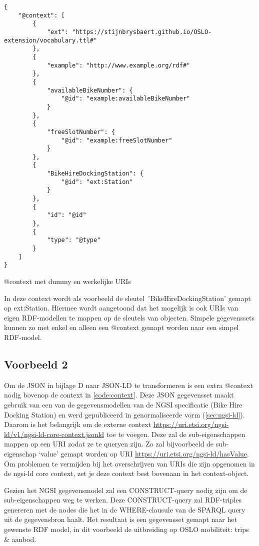 \begin{code}
\begin{verbatim}
{
    "@context": [
        {
            "ext": "https://stijnbrysbaert.github.io/OSLO-extension/vocabulary.ttl#"
        },
        {
            "example": "http://www.example.org/rdf#"
        },
        {
            "availableBikeNumber": {
                "@id": "example:availableBikeNumber"
            }
        },
        {
            "freeSlotNumber": {
                "@id": "example:freeSlotNumber"
            }
        },
        {
            "BikeHireDockingStation": {
                "@id": "ext:Station"
            }
        },
        {
            "id": "@id"
        },
        {
            "type": "@type"
        }
    ]
}
\end{verbatim}
\caption{@context met dummy en werkelijke URIs}
\label{code:context}
\end{code}

In deze context wordt als voorbeeld de sleutel ´BikeHireDockingStation' gemapt op ext:Station. Hiermee wordt aangetoond dat het mogelijk is ook URIs van eigen RDF-modellen te mappen op de sleutels van objecten. Simpele gegevenssets kunnen zo met enkel en alleen een @context gemapt worden naar een simpel RDF-model. 

\subsection{Voorbeeld 2}
\label{subsec:vb2}
Om de JSON in bijlage D naar JSON-LD te transformeren is een extra @context nodig bovenop de context in \ref{code:context}. Deze JSON gegevensset maakt gebruik van een van de gegevensmodellen van de NGSI specificatie (Bike Hire Docking Station) en werd gepubliceerd in genormaliseerde vorm (\ref{sec:ngsi-ld}). Daarom is het belangrijk om de externe context \url{https://uri.etsi.org/ngsi-ld/v1/ngsi-ld-core-context.jsonld} toe te voegen. Deze zal de sub-eigenschappen mappen op een URI zodat ze te queryen zijn. Zo zal bijvoorbeeld de sub-eigenschap `value' gemapt worden op URI \url{https://uri.etsi.org/ngsi-ld/hasValue}.
Om problemen te vermijden bij het overschrijven van URIs die zijn opgenomen in de ngsi-ld core context, zet je deze context best bovenaan in het context-object.

Gezien het NGSI gegevensmodel zal een CONSTRUCT-query nodig zijn om de sub-eigenschappen weg te werken. Deze CONSTRUCT-query zal RDF-triples genereren met de nodes die het in de WHERE-clausule van de SPARQL query uit de gegevensbron haalt. Het resultaat is een gegevensset gemapt naar het gewenste RDF model, in dit voorbeeld de uitbreiding op OSLO mobiliteit: trips \& aanbod. 

